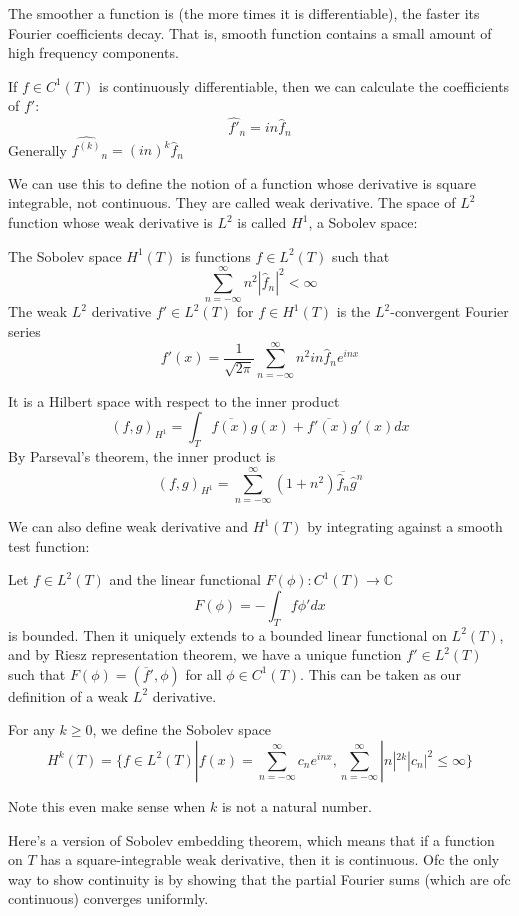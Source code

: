 \documentclass[main.tex]{subfiles}
\begin{document}
The smoother a function is (the more times it is differentiable), the faster its Fourier coefficients decay. That is, smooth function contains a small amount of high frequency components.

If $f \in C^1(T)$ is continuously differentiable, then we can calculate the coefficients of $f'$:
$$
\hat{f'}_n = in\hat{f}_n
$$
Generally $\hat{f^{(k)}}_n= (in)^k \hat{f}_n$

We can use this to define the notion of a function whose derivative is square integrable, not continuous. They are called weak derivative. The space of $L^2$ function whose weak derivative is $L^2$ is called $H^1$, a Sobolev space:

\begin{definition}
The Sobolev space $H^1(T)$ is functions $f \in L^2(T)$ such that 
$$
\sum_{n = -\infty} ^{\infty} n^2 |\hat{f}_n|^2 < \infty
$$
The weak $L^2$ derivative $f' \in L^2(T)$ for $f \in H^1(T)$ is the $L^2$-convergent Fourier series
$$
f'(x) = \frac{1}{\sqrt{2\pi}} \sum_{n = -\infty} ^{\infty} n^2 in \hat{f}_n e^{inx}
$$
\end{definition}

It is a Hilbert space with respect to the inner product 
$$
(f, g)_{H^1} = \int_T \overline{f(x)}g(x) + \overline{f'(x)}g'(x) dx
$$
By Parseval's theorem, the inner product is 
$$
(f,g)_{H^1} = \sum_{n = -\infty} ^{\infty} (1 + n^2)\overline{\hat{f}_n} \hat{g}^n
$$

We can also define weak derivative and $H^1(T)$ by integrating against a smooth test function:

Let $f \in L^2(T)$ and the linear functional $F(\phi): C^1(T) \rightarrow \mathbb{C}$
$$
F(\phi) = - \int_T f\phi' dx
$$
is bounded. Then it uniquely extends to a bounded linear functional on $L^2(T)$, and by Riesz representation theorem, we have a unique function $f' \in L^2(T)$ such that $F(\phi) = (\overline{f}', \phi)$ for all $\phi \in C^1(T)$. This can be taken as our definition of a weak $L^2$ derivative.

For any $k \geq 0$, we define the Sobolev space
$$
H^k(T) = \{f \in L^2(T) | f(x) = \sum_{n = -\infty} ^{\infty} c_n e^{inx}, \sum_{n = -\infty} ^{\infty} |n|^{2k}|c_n|^2 \leq \infty \}
$$

Note this even make sense when $k$ is not a natural number.

Here's a version of Sobolev embedding theorem, which means that if a function on $T$ has a square-integrable weak derivative, then it is continuous. Ofc the only way to show continuity is by showing that the partial Fourier sums (which are ofc continuous) converges uniformly.
\end{document}
